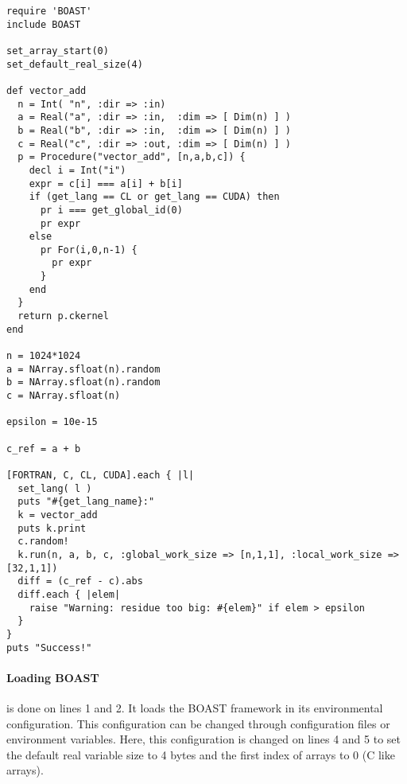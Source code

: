 \lstset{style=BOAST}
\begin{lstlisting}
require 'BOAST'
include BOAST

set_array_start(0)
set_default_real_size(4)

def vector_add
  n = Int( "n", :dir => :in)
  a = Real("a", :dir => :in,  :dim => [ Dim(n) ] )
  b = Real("b", :dir => :in,  :dim => [ Dim(n) ] )
  c = Real("c", :dir => :out, :dim => [ Dim(n) ] )
  p = Procedure("vector_add", [n,a,b,c]) {
    decl i = Int("i")
    expr = c[i] === a[i] + b[i]
    if (get_lang == CL or get_lang == CUDA) then
      pr i === get_global_id(0)
      pr expr
    else
      pr For(i,0,n-1) {
        pr expr
      }
    end
  }
  return p.ckernel
end

n = 1024*1024
a = NArray.sfloat(n).random
b = NArray.sfloat(n).random
c = NArray.sfloat(n)

epsilon = 10e-15

c_ref = a + b

[FORTRAN, C, CL, CUDA].each { |l|
  set_lang( l )
  puts "#{get_lang_name}:"
  k = vector_add
  puts k.print
  c.random!
  k.run(n, a, b, c, :global_work_size => [n,1,1], :local_work_size => [32,1,1])
  diff = (c_ref - c).abs
  diff.each { |elem|
    raise "Warning: residue too big: #{elem}" if elem > epsilon
  }
}
puts "Success!"
\end{lstlisting}

\paragraph{Loading BOAST} is done on lines 1 and 2.
It loads the BOAST framework in its environmental configuration.
This configuration can be changed through configuration files or environment variables.
Here, this configuration is changed on lines 4 and 5 to set the default real variable size to 4 bytes and the first index of arrays to 0 (C like arrays).


